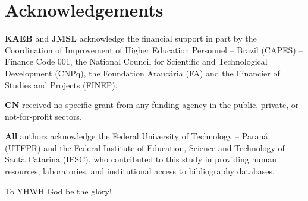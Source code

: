 \section*{Acknowledgements}

    \textbf{KAEB}  and  \textbf{JMSL}  acknowledge  the  financial  support  in  part   by   the
    Coordination of Improvement of Higher Education Personnel -- Brazil (CAPES) -- Finance  Code
    001,  the  National  Council  for  Scientific  and  Technological  Development  (CNPq),  the
    Foundation Araucária (FA) and the Financier of Studies and Projects (FINEP).

    \textbf{CN} received no specific grant from any funding agency in the  public,  private,  or
    not-for-profit sectors.

    \textbf{All} authors acknowledge the Federal University of Technology -- Paraná (UTFPR)  and
    the Federal Institute of Education, Science and Technology of  Santa  Catarina  (IFSC),  who
    contributed to this study in providing  human  resources,  laboratories,  and  institutional
    access to bibliography databases.

    To YHWH God be the glory!


